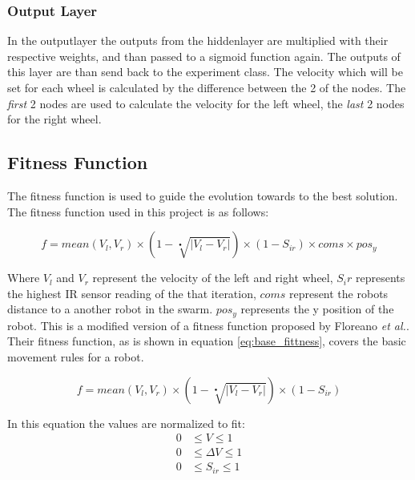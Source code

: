 \subsubsection{Output Layer}
In the outputlayer the outputs from the hiddenlayer are multiplied with their respective weights, and than passed to a sigmoid function again.
The outputs of this layer are than send back to the experiment class.
The velocity which will be set for each wheel is calculated by the difference between the 2 of the nodes. 
The \textit{first} 2 nodes are used to calculate the velocity for the left wheel, the \textit{last} 2 nodes for the right wheel. 

\subsection{Fitness Function}\label{chap2:fitness_function}
The fitness function is used to guide the evolution towards to the best solution.
The fitness function used in this project is as follows:

\begin{equation}\label{eq:full_fittness}
f = mean(V_l, V_r) \times (1 - \sqrt[•]{|V_l - V_r|}) \times (1 - S_{ir}) \times coms \times pos_y
\end{equation}

Where $V_l$ and $V_r$ represent the velocity of the left and right wheel, $S_ir$ represents the highest IR sensor reading of the that iteration, $coms$ represent the robots distance to a another robot in the swarm. $pos_y$ represents the y position of the robot. 
This is a modified version of a fitness function proposed by Floreano \textit{et al.}\cite{499791}. 
Their fitness function, as is shown in equation \ref{eq:base_fittness}, covers the basic movement rules for a robot. 

\begin{equation}\label{eq:base_fittness}
f = mean(V_l, V_r) \times ( 1 - \sqrt[•]{|V_l - V_r|}) \times (1 - S_{ir})
\end{equation}

In this equation the values are normalized to fit:
\begin{align*}
	0  &\leq V \leq 1 \\  
	0  &\leq \Delta V  \leq 1 \\
	0  &\leq S_{ir} \leq 1
\end{align*}

